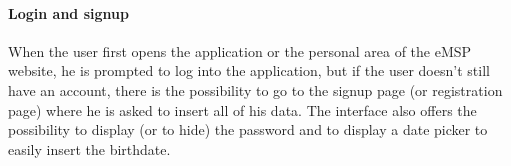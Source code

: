 \paragraph{Login and signup} When the user first opens the application or the personal area of the eMSP website, he is prompted to log into the application, but if the user doesn't still have an account, there is the possibility to go to the signup page (or registration page) where he is asked to insert all of his data. The interface also offers the possibility to display (or to hide) the password and to display a date picker to easily insert the birthdate.

\begin{figure}[h!]
    \centering
    \begin{minipage}{0.49\textwidth}
        \centering

\end{minipage}
\end{figure}
